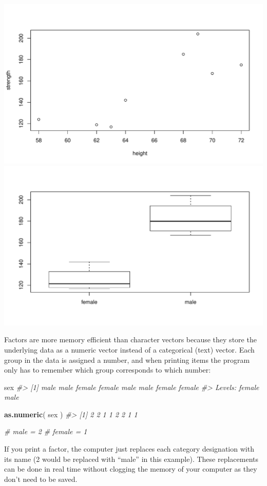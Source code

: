 \documentclass[]{book}
\newenvironment{Shaded}{\begin{snugshade}}{\end{snugshade}}
\newcommand{\CommentTok}[1]{\textcolor[rgb]{0.56,0.35,0.01}{\textit{#1}}}
\newcommand{\KeywordTok}[1]{\textcolor[rgb]{0.13,0.29,0.53}{\textbf{#1}}}
\newcommand{\NormalTok}[1]{#1}
\theoremstyle{definition}
\theoremstyle{definition}
\theoremstyle{definition}
\theoremstyle{remark}
\begin{document}
\begin{center}\includegraphics[width=0.7\linewidth]{DS4PS-I_files/figure-latex/unnamed-chunk-45-1} \includegraphics[width=0.7\linewidth]{DS4PS-I_files/figure-latex/unnamed-chunk-45-2} \end{center}

Factors are more memory efficient than character vectors because they
store the underlying data as a numeric vector instead of a categorical
(text) vector. Each group in the data is assigned a number, and when
printing items the program only has to remember which group corresponds
to which number:

\begin{Shaded}
\begin{Highlighting}[]
\NormalTok{sex}
\CommentTok{#> [1] male   male   female female male   male   female female}
\CommentTok{#> Levels: female male}

\KeywordTok{as.numeric}\NormalTok{( sex )}
\CommentTok{#> [1] 2 2 1 1 2 2 1 1}

\CommentTok{#  male = 2}
\CommentTok{#  female = 1}
\end{Highlighting}
\end{Shaded}

If you print a factor, the computer just replaces each category
designation with its name (2 would be replaced with ``male'' in this
example). These replacements can be done in real time without clogging
the memory of your computer as they don't need to be saved.
\end{document}
